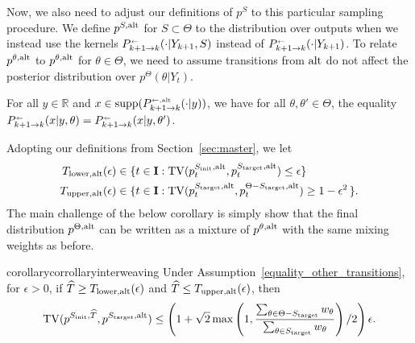 \noindent Now, we also need to adjust our definitions of $p^S$ to this particular sampling procedure. We define $p^{S,\mathrm{alt}}$ for $S \subset \Theta$ to the distribution over outputs when we instead use the kernels $\kernelreverse[]_{k+1\to k} (\cdot|Y_{k+1},S)$ instead of $\kernelreverse[]_{k+1\to k} (\cdot|Y_{k+1})$. To relate $p^{\theta,\mathrm{alt}}$ to $p^{\theta,\mathrm{alt}}$ for $\theta \in \Theta$, we need to assume transitions from $\mathrm{alt}$ do not affect the posterior distribution over $p^{\Theta}(\theta|Y_t)$. 
\begin{assumption}\label{equality_other_transitions}
For all $y \in \mathbb{R}$ and $x \in \supp(\kernelreverse[\alt]_{k+1\to k} (\cdot|y))$, we have for all $\theta,\theta' \in \Theta$, the equality $\kernelreverse[]_{k+1\to k} (x|y,\theta)=\kernelreverse[]_{k+1\to k} (x|y,\theta')$. 
\end{assumption}
\noindent Adopting our definitions from Section~\ref{sec:master}, we let \begin{align}
T_{\mathrm{lower},\mathrm{alt}}(\epsilon) \in  \{&t \in  \mathbf{I}:  \mathrm{TV}(p_{t}^{S_{\mathrm{init}},\mathrm{alt}  },p_{t}^{S_{\mathrm{target}},\mathrm{alt}}) \leq \epsilon\} \label{eq:Tlower_alt}  \\
T_{\mathrm{upper},\mathrm{alt}}(\epsilon)\in  \{&t \in \mathbf{I}:\mathrm{TV}(p_{t}^{S_{\mathrm{target}},\mathrm{alt}}  ,p_{t}^{\Theta-S_{\mathrm{target}},\mathrm{alt} }) \geq 1-\epsilon^2\,\}.  \label{eq:Tupper_alt}
\end{align}
The main challenge of the below corollary is simply show that the final distribution $p^{\Theta,\mathrm{alt}}$ can be written as a mixture of $p^{\theta,\mathrm{alt}}$ with the same mixing weights as before.
\begin{restatable}{corollary}{corrollaryinterweaving}\label{corr:interweaving}
Under Assumption~\ref{equality_other_transitions}, for $\epsilon > 0$, if $\widehat{T} \ge T_{\mathrm{lower},\mathrm{alt}}(\epsilon)$ and $\widehat{T} \le T_{\mathrm{upper},\mathrm{alt}}(\epsilon)$, then  
\begin{equation}
\TV(\modrevlaw{\Sinit}{\wh{T}}{}, p^{\Send,\alt}) \leq \left(1+\sqrt{2}\max\left(1,\frac{\sum_{\theta \in \Theta-\Send} w_\theta}{\sum_{\theta \in \Send} w_\theta}\right)/2\right)  \epsilon.
\end{equation}
\end{restatable} 
